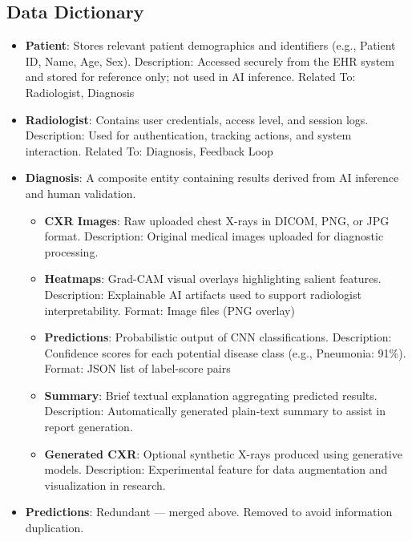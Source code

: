 \documentclass[12pt]{article}
\begin{document}
\subsection{Data Dictionary}
\begin{itemize}
    \item \textbf{Patient}: Stores relevant patient demographics and identifiers (e.g., Patient ID, Name, Age, Sex).\newline
    Description: Accessed securely from the EHR system and stored for reference only; not used in AI inference.\newline
    Related To: Radiologist, Diagnosis

    \item \textbf{Radiologist}: Contains user credentials, access level, and session logs.\newline
    Description: Used for authentication, tracking actions, and system interaction.\newline
    Related To: Diagnosis, Feedback Loop

    \item \textbf{Diagnosis}: A composite entity containing results derived from AI inference and human validation.
    \begin{itemize}
        \item \textbf{CXR Images}: Raw uploaded chest X-rays in DICOM\cite{dicom}, PNG, or JPG format.\newline
        Description: Original medical images uploaded for diagnostic processing.

        \item \textbf{Heatmaps}: Grad-CAM visual overlays highlighting salient features.\newline
        Description: Explainable AI artifacts used to support radiologist interpretability.\newline
        Format: Image files (PNG overlay)

        \item \textbf{Predictions}: Probabilistic output of CNN classifications.\newline
        Description: Confidence scores for each potential disease class (e.g., Pneumonia: 91\%).\newline
        Format: JSON list of label-score pairs

        \item \textbf{Summary}: Brief textual explanation aggregating predicted results.\newline
        Description: Automatically generated plain-text summary to assist in report generation.

        \item \textbf{Generated CXR}: Optional synthetic X-rays produced using generative models.\newline
        Description: Experimental feature for data augmentation and visualization in research.
    \end{itemize}

    \item \textbf{Predictions}: Redundant --- merged above. Removed to avoid information duplication. %
\end{itemize}
\end{document}
